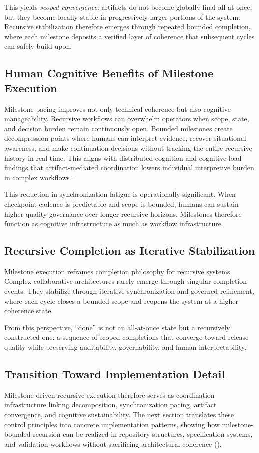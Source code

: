This yields \textit{scoped convergence}: artifacts do not become globally final all at once, but they become locally stable in progressively larger portions of the system. Recursive stabilization therefore emerges through repeated bounded completion, where each milestone deposits a verified layer of coherence that subsequent cycles can safely build upon.

\subsection{Human Cognitive Benefits of Milestone Execution}

Milestone pacing improves not only technical coherence but also cognitive manageability. Recursive workflows can overwhelm operators when scope, state, and decision burden remain continuously open. Bounded milestones create decompression points where humans can interpret evidence, recover situational awareness, and make continuation decisions without tracking the entire recursive history in real time. This aligns with distributed-cognition and cognitive-load findings that artifact-mediated coordination lowers individual interpretive burden in complex workflows \cite{Hutchins1995CognitionWild,Sweller1988CognitiveLoad}.

This reduction in synchronization fatigue is operationally significant. When checkpoint cadence is predictable and scope is bounded, humans can sustain higher-quality governance over longer recursive horizons. Milestones therefore function as cognitive infrastructure as much as workflow infrastructure.

\subsection{Recursive Completion as Iterative Stabilization}

Milestone execution reframes completion philosophy for recursive systems. Complex collaborative architectures rarely emerge through singular completion events. They stabilize through iterative synchronization and governed refinement, where each cycle closes a bounded scope and reopens the system at a higher coherence state.

From this perspective, ``done'' is not an all-at-once state but a recursively constructed one: a sequence of scoped completions that converge toward release quality while preserving auditability, governability, and human interpretability.

\subsection{Transition Toward Implementation Detail}

Milestone-driven recursive execution therefore serves as coordination infrastructure linking decomposition, synchronization pacing, artifact convergence, and cognitive sustainability. The next section translates these control principles into concrete implementation patterns, showing how milestone-bounded recursion can be realized in repository structures, specification systems, and validation workflows without sacrificing architectural coherence ().
